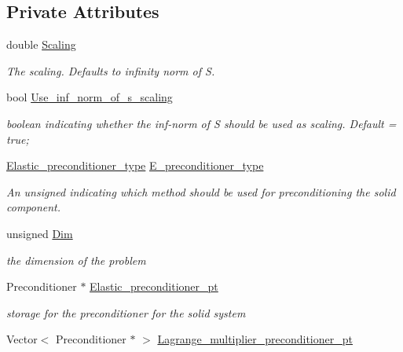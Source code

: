 \subsection*{Private Attributes}
\begin{DoxyCompactItemize}
\item 
double \hyperlink{classoomph_1_1PseudoElasticPreconditionerOld_a563f753bed7b33a169ec15b796864eba}{Scaling}
\begin{DoxyCompactList}\small\item\em The scaling. Defaults to infinity norm of S. \end{DoxyCompactList}\item 
bool \hyperlink{classoomph_1_1PseudoElasticPreconditionerOld_a475f2a2576128e4a17ee494343438ba5}{Use\+\_\+inf\+\_\+norm\+\_\+of\+\_\+s\+\_\+scaling}
\begin{DoxyCompactList}\small\item\em boolean indicating whether the inf-\/norm of S should be used as scaling. Default = true; \end{DoxyCompactList}\item 
\hyperlink{classoomph_1_1PseudoElasticPreconditionerOld_a6748360e3e2fbd4766d837a520dadfd0}{Elastic\+\_\+preconditioner\+\_\+type} \hyperlink{classoomph_1_1PseudoElasticPreconditionerOld_a4cb348ca052099063282dc8adb76d5fc}{E\+\_\+preconditioner\+\_\+type}
\begin{DoxyCompactList}\small\item\em An unsigned indicating which method should be used for preconditioning the solid component. \end{DoxyCompactList}\item 
unsigned \hyperlink{classoomph_1_1PseudoElasticPreconditionerOld_a61d6f0e7db9902aa2bde14bfdf933bae}{Dim}
\begin{DoxyCompactList}\small\item\em the dimension of the problem \end{DoxyCompactList}\item 
Preconditioner $\ast$ \hyperlink{classoomph_1_1PseudoElasticPreconditionerOld_a14f587c9c01c392b14c235bde00453b3}{Elastic\+\_\+preconditioner\+\_\+pt}
\begin{DoxyCompactList}\small\item\em storage for the preconditioner for the solid system \end{DoxyCompactList}\item 
Vector$<$ Preconditioner $\ast$ $>$ \hyperlink{classoomph_1_1PseudoElasticPreconditionerOld_a14f5c801cd3c9128705902002efe51e8}{Lagrange\+\_\+multiplier\+\_\+preconditioner\+\_\+pt}

\end{DoxyCompactItemize}

